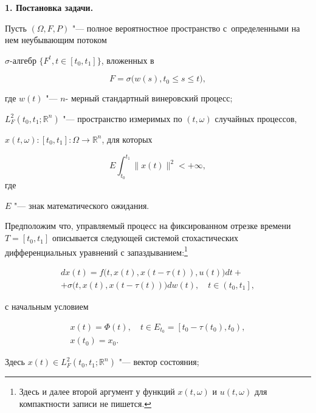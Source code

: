 \smallskip



 \textbf {1. Постановка задачи.} 

 Пусть $ (\Omega, F, P) $ "--- полное вероятностное  пространство с~определенными на нем неубывающим потоком 

 $\sigma $-алгебр $ \lbrace F^{t}, t\in[t_{0},t_{1}]\rbrace $,  вложенных в  

$$F= \sigma \bigl(w(s) , t_{0} \leq s\leq t\bigr),$$

где  $ w(t) $ "--- $ n $- мерный стандартный винеровский процесс; 

$ L_{F}^{2} (t_{0}, t_{1}; \mathbb R^{n}) $ "--- пространство измеримых по $ (t, \omega) $ случайных процессов, 

$ x(t, \omega): [t_{0}, t_{1}] : \Omega \rightarrow \mathbb R^{n} $, для которых 

$$ E \int^{t_{1}}_{t_{0}}\| x(t)\|^{2}< +\infty ,$$ где 

$ E $ "--- знак математического ожидания.

 

 Предположим что, управляемый процесс на фиксированном отрезке времени $ T=[t_{0}, t_{1}] $  описывается  следующей системой стохастических дифференциальных уравнений с запаздыванием:\footnote{Здесь и далее  второй аргумент у функций $x(t, \omega)$  и  $u(t, \omega)$ для компактности записи не пишется.}

\begin{multline}

dx(t)=f \bigl(t, x(t), x(t-\tau (t)), u(t) \bigr)dt+ \\ +

\sigma \bigl(t, x(t), x(t-\tau (t)) \bigr)d w(t), \quad  t\in \left( t_{0}, t_{1}\right] ,

\label{mast:e1}

\end{multline}

с начальным условием

\begin{gather}

\label{mast:e3}

x(t)=\Phi (t), \quad t\in E_{t_{0}}=\left[ t_{0}-\tau (t_{0}), t_{0}\right) , \\

\label{mast:e3}

x(t_{0})=x_{0}.

\end{gather}

Здесь $ x(t)\in L_{F}^{2} (t_{0}, t_{1}; \mathbb R^{n}) $ "--- вектор состояния; 

